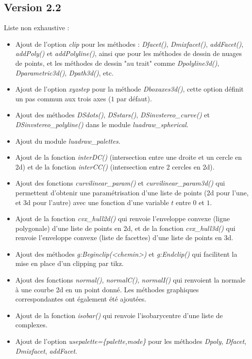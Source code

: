 \subsection{Version 2.2}
Liste non exhaustive :
\begin{itemize}
    \item Ajout de l'option \emph{clip} pour les méthodes : \emph{Dfacet()}, \emph{Dmixfacet()}, \emph{addFacet()}, \emph{addPoly()} et \emph{addPolyline()}, ainsi que pour les méthodes de dessin de nuages de points, et les méthodes de dessin "au trait" comme \emph{Dpolyline3d()}, \emph{Dparametric3d()}, \emph{Dpath3d()}, etc.
    \item Ajout de l'option \emph{xyzstep} pour la méthode \emph{Dboxaxes3d()}, cette option définit un pas commun aux trois axes ($1$ par défaut).
    \item Ajout des méthodes \emph{DSdots()}, \emph{DSstars()}, \emph{DSinvstereo\_curve()} et \emph{DSinvstereo\_polyline()} dans le module \emph{luadraw\_spherical}.
    \item Ajout du module \emph{luadraw\_palettes}.
    \item Ajout de la fonction \emph{interDC()} (intersection entre une droite et un cercle en 2d) et de la fonction \emph{interCC()} (intersection entre 2 cercles en 2d).
    \item Ajout des fonctions \emph{curvilinear\_param()} et \emph{curvilinear\_param3d()} qui permettent d'obtenir une paramétrisation d'une liste de points (2d pour l'une, et 3d pour l'autre) avec une fonction d'une variable $t$ entre $0$ et $1$.
    \item Ajout de la fonction \emph{cvx\_hull2d()} qui renvoie l'enveloppe convexe (ligne polygonale) d'une liste de points en 2d, et de la fonction \emph{cvx\_hull3d()} qui renvoie l'enveloppe convexe (liste de facettes) d'une liste de points en 3d.
    \item Ajout des méthodes \emph{g:Beginclip(<chemin>)} et \emph{g:Endclip()} qui facilitent la mise en place d'un clipping par tikz.
    \item Ajout des fonctions \emph{normal()}, \emph{normalC()}, \emph{normalI()} qui renvoient la normale à une courbe 2d en un point donné. Les méthodes graphiques correspondantes ont également été ajoutées.
    \item Ajout de la fonction \emph{isobar()} qui renvoie l'isobarycentre d'une liste de complexes.
    \item Ajout de l'option \emph{usepalette=\{palette,mode\}} pour les méthodes \emph{Dpoly}, \emph{Dfacet}, \emph{Dmixfacet}, \emph{addFacet}.

\end{itemize}
